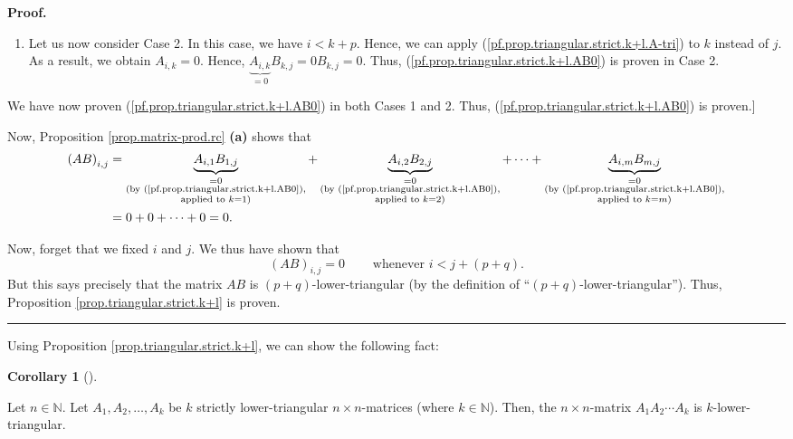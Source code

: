 \documentclass[numbers=enddot,12pt,final,onecolumn,notitlepage]{scrartcl}%
\theoremstyle{definition}
\newtheorem{coro}[theo]{Corollary}
\newenvironment{corollary}[1][]
{\begin{coro}[#1]\begin{leftbar}}
{\end{leftbar}\end{coro}}
\newenvironment{proof}[1][Proof]{\noindent\textbf{#1.} }{\ \rule{0.5em}{0.5em}}
\begin{document}
\begin{proof}
\begin{enumerate}
\item Let us now consider Case 2. In this case, we have $i<k+p$. Hence, we can
apply (\ref{pf.prop.triangular.strict.k+l.A-tri}) to $k$ instead of $j$. As a
result, we obtain $A_{i,k}=0$. Hence, $\underbrace{A_{i,k}}_{=0}%
B_{k,j}=0B_{k,j}=0$. Thus, (\ref{pf.prop.triangular.strict.k+l.AB0}) is proven
in Case 2.
\end{enumerate}

We have now proven (\ref{pf.prop.triangular.strict.k+l.AB0}) in both Cases 1
and 2. Thus, (\ref{pf.prop.triangular.strict.k+l.AB0}) is proven.]

Now, Proposition \ref{prop.matrix-prod.rc} \textbf{(a)} shows that%
\begin{align*}
\left(  AB\right)  _{i,j}  &  =\underbrace{A_{i,1}B_{1,j}}%
_{\substack{=0\\\text{(by (\ref{pf.prop.triangular.strict.k+l.AB0}%
),}\\\text{applied to }k=1\text{)}}}+\underbrace{A_{i,2}B_{2,j}}%
_{\substack{=0\\\text{(by (\ref{pf.prop.triangular.strict.k+l.AB0}%
),}\\\text{applied to }k=2\text{)}}}+\cdots+\underbrace{A_{i,m}B_{m,j}%
}_{\substack{=0\\\text{(by (\ref{pf.prop.triangular.strict.k+l.AB0}%
),}\\\text{applied to }k=m\text{)}}}\\
&  =0+0+\cdots+0=0.
\end{align*}


Now, forget that we fixed $i$ and $j$. We thus have shown that%
\[
\left(  AB\right)  _{i,j}=0\ \ \ \ \ \ \ \ \ \ \text{whenever }i<j+\left(
p+q\right)  .
\]
But this says precisely that the matrix $AB$ is $\left(  p+q\right)
$-lower-triangular (by the definition of \textquotedblleft$\left(  p+q\right)
$-lower-triangular\textquotedblright). Thus, Proposition
\ref{prop.triangular.strict.k+l} is proven.
\end{proof}

Using Proposition \ref{prop.triangular.strict.k+l}, we can show the following fact:

\begin{corollary}
\label{cor.triangular.strict.kprod}Let $n\in\mathbb{N}$. Let $A_{1}%
,A_{2},\ldots,A_{k}$ be $k$ strictly lower-triangular $n\times n$-matrices
(where $k\in\mathbb{N}$). Then, the $n\times n$-matrix $A_{1}A_{2}\cdots
A_{k}$ is $k$-lower-triangular.
\end{corollary}
\end{document}
